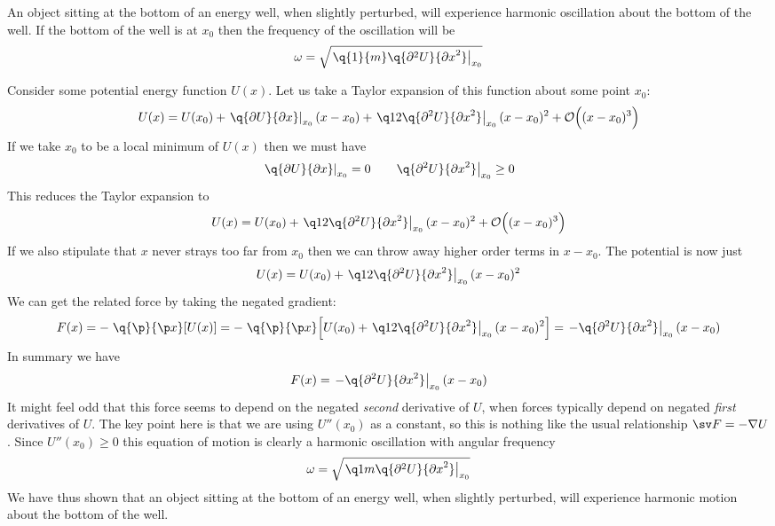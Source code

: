 



An object sitting at the bottom of an energy well, when slightly perturbed,
will experience harmonic oscillation about the bottom of the well. If the
bottom of the well is at $x_0$ then the frequency of the oscillation will be
$$
\omega = \sqrt{\left.\q{1}{m}\q{\partial^2 U}{{\partial x}^2}\right|_{x_0}}
$$


Consider some potential energy function $U(x)$. Let us take a Taylor expansion
of this function about some point $x_0$:
$$
U(x)
=
U(x_0)
+ \left.\q{\partial U}{\partial x}\right|_{x_0}(x - x_0)
+ \left.\q12\q{\partial^2 U}{{\partial x}^2}\right|_{x_0}(x - x_0)^2
+ {\cal O}\Bigl((x-x_0)^3\Bigr)
$$
If we take $x_0$ to be a local minimum of $U(x)$ then we must have
$$
\left.\q{\partial U}{\partial x}\right|_{x_0} = 0
\hskip18pt
\left.\q{\partial^2 U}{{\partial x}^2}\right|_{x_0} \ge 0
$$
This reduces the Taylor expansion to
$$
U(x)
=
U(x_0)
+ \left.\q12\q{\partial^2 U}{{\partial x}^2}\right|_{x_0}(x - x_0)^2
+ {\cal O}\Bigl((x-x_0)^3\Bigr)
$$
If we also stipulate that $x$ never strays too far from $x_0$ then we can
throw away higher order terms in $x - x_0$. The potential is now just
$$
U(x)
=
U(x_0)
+ \left.\q12\q{\partial^2 U}{{\partial x}^2}\right|_{x_0}(x - x_0)^2
$$
We can get the related force by taking the negated gradient:
$$
F(x)
=
-\left.\q{\p}{\p x}\middle[U(x)\right]
=
-\left.\q{\p}{\p x}\middle[
U(x_0)
+ \left.\q12\q{\partial^2 U}{{\partial x}^2}\right|_{x_0}(x - x_0)^2
\right]
=
\left.-\q{\partial^2 U}{{\partial x}^2}\right|_{x_0}(x - x_0)
$$
In summary we have
$$
F(x)
=
\left.-\q{\partial^2 U}{{\partial x}^2}\right|_{x_0}(x - x_0)
$$
It might feel odd that this force seems to depend on the negated {\it second}
derivative of $U$, when forces typically depend on negated {\it first}
derivatives of $U$. The key point here is that we are using $U''(x_0)$ as a
constant, so this is nothing like the usual relationship $\sv F = -\nabla U$.
Since $U''(x_0) \ge 0$ this equation of motion is clearly a harmonic
oscillation with angular frequency
$$
\omega = \sqrt{\left.\q1m\q{\partial^2 U}{{\partial x}^2}\right|_{x_0}}
$$
We have thus shown that an object sitting at the bottom of an energy well,
when slightly perturbed, will experience harmonic motion about the bottom of
the well.

\bye
